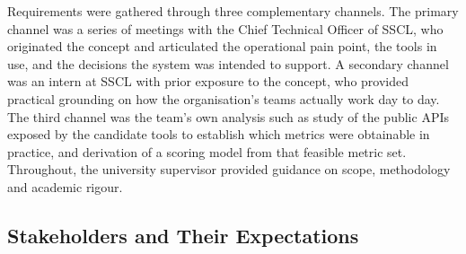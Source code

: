 Requirements were gathered through three complementary channels. The primary
channel was a series of meetings with the Chief Technical Officer of
SSCL, who originated the concept and articulated the operational pain point,
the tools in use, and the decisions the system was intended to support. A
secondary channel was an intern at SSCL with prior exposure to the concept,
who provided practical grounding on how the organisation's teams actually work
day to day. The third channel was the team's own analysis such as study of the public
APIs exposed by the candidate tools to establish which metrics were obtainable in
practice, and derivation of a scoring model from that feasible metric set.
Throughout, the university supervisor provided guidance on scope, methodology and
academic rigour.

\subsection{Stakeholders and Their Expectations}
\label{subsec:stakeholders}


